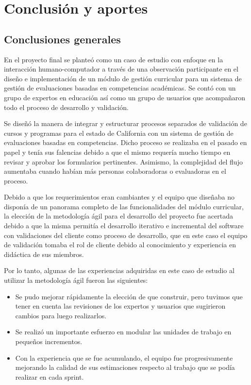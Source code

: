 
\section{Conclusión y aportes}

\subsection{Conclusiones generales}
En el proyecto final se planteó como un caso de estudio con enfoque en la interacción humano-computador a través de una observación participante en el diseño e implementación de un módulo de gestión curricular para un sistema de gestión de evaluaciones basadas en competencias académicas. Se contó con un grupo de expertos en educación así como un grupo de usuarios que acompañaron todo el proceso de desarrollo y validación.

Se diseñó la manera de integrar y estructurar procesos separados de validación de cursos y programas para el estado de California con un sistema de gestión de evaluaciones basadas en competencias. Dicho proceso se realizaba en el pasado en papel y tenía sus falencias debido a que el mismo requería mucho tiempo en revisar y aprobar los formularios pertinentes. Asimismo, la complejidad del flujo aumentaba cuando habían más personas colaboradoras o evaluadoras en el proceso.

Debido a que los requerimientos eran cambiantes y el equipo que diseñaba no disponía de un panorama completo de las funcionalidades del módulo curricular, la elección de la metodología ágil para el desarrollo del proyecto fue acertada debido a que la misma permitía el desarrollo iterativo e incremental del software con validaciones del cliente como proceso de desarrollo, que en este caso el equipo de validación tomaba el rol de cliente debido al conocimiento y experiencia en didáctica de sus miembros.

Por lo tanto, algunas de las experiencias adquiridas en este caso de estudio al utilizar la metodología ágil fueron las siguientes:
\begin{itemize}
	\item Se pudo mejorar rápidamente la elección de que construir, pero tuvimos que tener en cuenta las revisiones de los expertos y usuarios que sugirieron cambios para luego realizarlos.
	\item Se realizó un importante esfuerzo en modular las unidades de trabajo en pequeños incrementos.
	\item Con la experiencia que se fue acumulando, el equipo fue progresivamente mejorando la calidad de sus estimaciones respecto al trabajo que se podía realizar en cada sprint.
\end{itemize}

